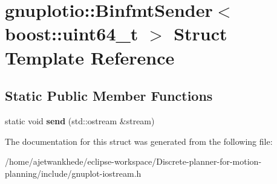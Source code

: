 \hypertarget{structgnuplotio_1_1BinfmtSender_3_01boost_1_1uint64__t_01_4}{}\section{gnuplotio\+:\+:Binfmt\+Sender$<$ boost\+:\+:uint64\+\_\+t $>$ Struct Template Reference}
\label{structgnuplotio_1_1BinfmtSender_3_01boost_1_1uint64__t_01_4}
\subsection*{Static Public Member Functions}
\begin{DoxyCompactItemize}
\item 
\mbox{\label{structgnuplotio_1_1BinfmtSender_3_01boost_1_1uint64__t_01_4_a9f57162a6baf940675236235556f62ba}} 
static void {\bfseries send} (std\+::ostream \&stream)
\end{DoxyCompactItemize}


The documentation for this struct was generated from the following file\+:\begin{DoxyCompactItemize}
\item 
/home/ajetwankhede/eclipse-\/workspace/\+Discrete-\/planner-\/for-\/motion-\/planning/include/gnuplot-\/iostream.\+h\end{DoxyCompactItemize}
